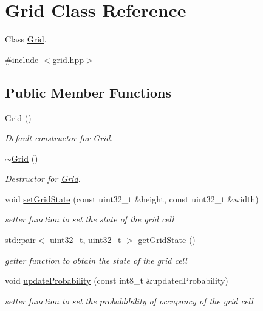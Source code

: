 \hypertarget{classGrid}{}\section{Grid Class Reference}
\label{classGrid}


Class \hyperlink{classGrid}{Grid}.  




{\ttfamily \#include $<$grid.\+hpp$>$}

\subsection*{Public Member Functions}
\begin{DoxyCompactItemize}
\item 
\hyperlink{classGrid_a4ac9ff4f63552b4c61ff90fcb35ad66c}{Grid} ()
\begin{DoxyCompactList}\small\item\em Default constructor for \hyperlink{classGrid}{Grid}. \end{DoxyCompactList}\item 
\hyperlink{classGrid_a3661d0a7f998caaaf8627d7a67072116}{$\sim$\+Grid} ()
\begin{DoxyCompactList}\small\item\em Destructor for \hyperlink{classGrid}{Grid}. \end{DoxyCompactList}\item 
void \hyperlink{classGrid_a82ee6491720390d8f57dc776b7eb4a9c}{set\+Grid\+State} (const uint32\+\_\+t \&height, const uint32\+\_\+t \&width)
\begin{DoxyCompactList}\small\item\em setter function to set the state of the grid cell \end{DoxyCompactList}\item 
std\+::pair$<$ uint32\+\_\+t, uint32\+\_\+t $>$ \hyperlink{classGrid_a4bb7afc469c8d1113912ecc066426c44}{get\+Grid\+State} ()
\begin{DoxyCompactList}\small\item\em getter function to obtain the state of the grid cell \end{DoxyCompactList}\item 
void \hyperlink{classGrid_aba57aa11c35e810c80a47f81e7f8d224}{update\+Probability} (const int8\+\_\+t \&updated\+Probability)
\begin{DoxyCompactList}\small\item\em setter function to set the probablibility of occupancy of the grid cell \end{DoxyCompactList}\item 

\end{DoxyCompactItemize}
